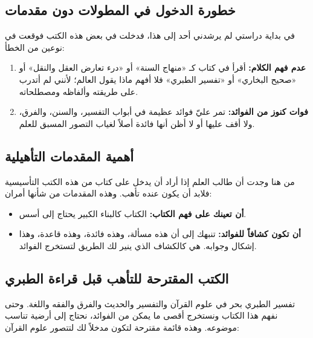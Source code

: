 \subsection{خطورة الدخول في المطولات دون مقدمات}
في بداية دراستي لم يرشدني أحد إلى هذا، فدخلت في بعض هذه الكتب فوقعت في نوعين من الخطأ:
\begin{enumerate}
    \item \textbf{عدم فهم الكلام:} أقرأ في كتاب كـ «منهاج السنة» أو «درء تعارض العقل والنقل» أو «صحيح البخاري» أو «تفسير الطبري» فلا أفهم ماذا يقول العالم؛ لأنني لم أتدرب على طريقته وألفاظه ومصطلحاته.
    \item \textbf{فوات كنوز من الفوائد:} تمر عليّ فوائد عظيمة في أبواب التفسير، والسنن، والفرق، ولا أقف عليها أو لا أظن أنها فائدة أصلاً لغياب التصور المسبق للعلم.
\end{enumerate}

\subsection{أهمية المقدمات التأهيلية}
من هنا وجدت أن طالب العلم إذا أراد أن يدخل على كتاب من هذه الكتب التأسيسية فلابد أن يكون عنده تأهب. وهذه المقدمات من شأنها أمران:
\begin{itemize}
    \item \textbf{أن تعينك على فهم الكتاب:} الكتاب كالبناء الكبير يحتاج إلى أسس.
    \item \textbf{أن تكون كشافاً للفوائد:} تنبهك إلى أن هذه مسألة، وهذه فائدة، وهذه قاعدة، وهذا إشكال وجوابه. هي كالكشاف الذي ينير لك الطريق لتستخرج الفوائد.
\end{itemize}

\subsection{الكتب المقترحة للتأهب قبل قراءة الطبري}
تفسير الطبري بحر في علوم القرآن والتفسير والحديث والفرق والفقه واللغة. وحتى نفهم هذا الكتاب ونستخرج أقصى ما يمكن من الفوائد، نحتاج إلى أرضية تناسب موضوعه. وهذه قائمة مقترحة لتكون مدخلاً لك لتتصور علوم القرآن:

